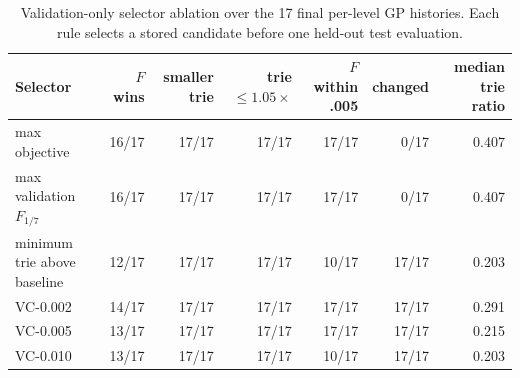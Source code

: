 \begin{table}[tb]
\centering\small
\caption{Validation-only selector ablation over the 17 final per-level GP histories. Each rule selects a stored candidate before one held-out test evaluation.}
\label{tab:final-selector-ablation}
\begin{tabular}{l r r r r r r}
\toprule
Selector & $F$ wins & smaller trie & trie $\leq 1.05\times$ & $F$ within .005 & changed & median trie ratio \\
\midrule
max objective & 16/17 & 17/17 & 17/17 & 17/17 & 0/17 & 0.407 \\
max validation $F_{1/7}$ & 16/17 & 17/17 & 17/17 & 17/17 & 0/17 & 0.407 \\
minimum trie above baseline & 12/17 & 17/17 & 17/17 & 10/17 & 17/17 & 0.203 \\
VC-0.002 & 14/17 & 17/17 & 17/17 & 17/17 & 17/17 & 0.291 \\
VC-0.005 & 13/17 & 17/17 & 17/17 & 17/17 & 17/17 & 0.215 \\
VC-0.010 & 13/17 & 17/17 & 17/17 & 10/17 & 17/17 & 0.203 \\
\bottomrule
\end{tabular}
\end{table}
